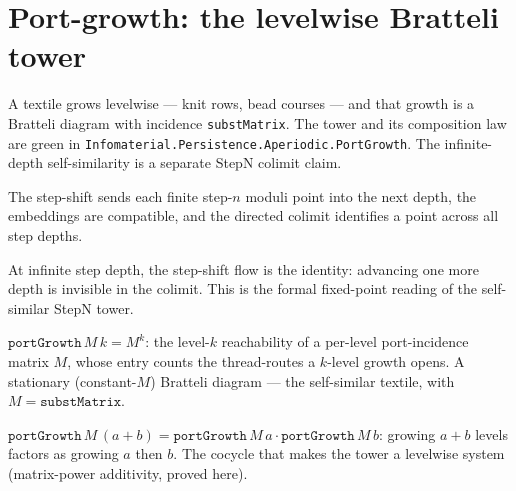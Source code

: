 \section{Port-growth: the levelwise Bratteli tower}

A textile grows levelwise --- knit rows, bead courses --- and that growth is a Bratteli diagram with
incidence \texttt{substMatrix}. The tower and its composition law are green in
\texttt{Infomaterial.Persistence.Aperiodic.PortGrowth}.  The infinite-depth
self-similarity is a separate StepN colimit claim.

\begin{theorem}\label{thm:stepn-shift-chain-colimit}\leanok{}
The step-shift sends each finite step-$n$ moduli point into the next depth,
the embeddings are compatible, and the directed colimit identifies a point
across all step depths.
\end{theorem}

\begin{theorem}\label{thm:stepn-colimit-rg-fixed-point}\leanok{}
At infinite step depth, the step-shift flow is the identity: advancing one
more depth is invisible in the colimit.  This is the formal fixed-point
reading of the self-similar StepN tower.
\end{theorem}

\begin{proposition}\label{thm:port-growth}\leanok{}
$\texttt{portGrowth}\,M\,k = M^k$: the level-$k$ reachability of a per-level port-incidence matrix
$M$, whose entry counts the thread-routes a $k$-level growth opens. A stationary (constant-$M$)
Bratteli diagram --- the self-similar textile, with $M = \texttt{substMatrix}$.
\end{proposition}

\begin{theorem}\label{thm:port-growth-telescopes}\leanok{}
$\texttt{portGrowth}\,M\,(a+b) = \texttt{portGrowth}\,M\,a \cdot \texttt{portGrowth}\,M\,b$: growing
$a+b$ levels factors as growing $a$ then $b$. The cocycle that makes the tower a levelwise system
(matrix-power additivity, proved here).
\end{theorem}

